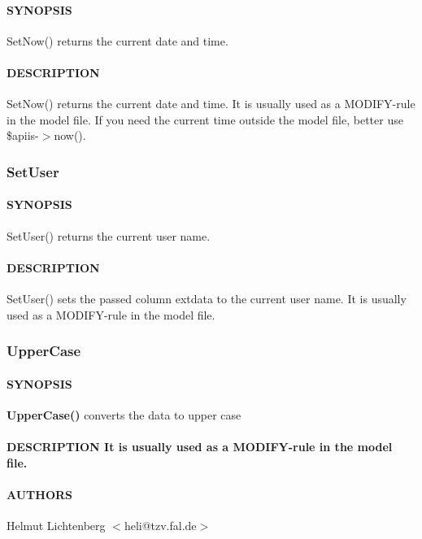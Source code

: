 \paragraph*{SYNOPSIS\label{SetNow_SYNOPSIS}}


SetNow() returns the current date and time.

\paragraph*{DESCRIPTION\label{SetNow_DESCRIPTION}}


SetNow() returns the current date and time. It is usually used as a
MODIFY-rule in the model file. If you need the current time outside the
model file, better use \$apiis-$>$now().

\subsubsection{SetUser\label{SetUser}}




\paragraph*{SYNOPSIS\label{SetUser_SYNOPSIS}}


SetUser() returns the current user name.

\paragraph*{DESCRIPTION\label{SetUser_DESCRIPTION}}


SetUser() sets the passed column extdata to the current user name. It is
usually used as a MODIFY-rule in the model file.

\subsubsection{UpperCase\label{UpperCase}}




\paragraph*{SYNOPSIS\label{UpperCase_SYNOPSIS}}


\textbf{UpperCase()} converts the data to upper case

\paragraph*{DESCRIPTION
It is usually used as a MODIFY-rule in the model file.\label{UpperCase_DESCRIPTION_It_is_usually_used_as_a_MODIFY-rule_in_the_model_file_}}
\paragraph*{AUTHORS\label{UpperCase_AUTHORS}}


Helmut Lichtenberg $<$heli@tzv.fal.de$>$

